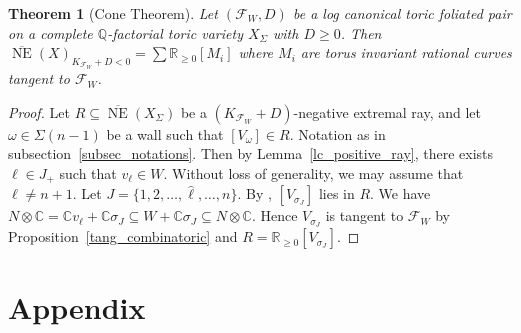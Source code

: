 \documentclass[12pt,reqno]{amsart}
\newtheorem{theorem}{Theorem}[section]
\theoremstyle{definition}
\newcommand{\mc}{\mathcal}
\newcommand{\mb}{\mathbb}
\newcommand{\on}{\operatorname}
\newcommand\cF{{\mathcal{F}}}
\newcommand\bC{{\mathbb C}}
\newcommand\bQ{{\mathbb Q}}
\newcommand\bR{{\mathbb R}}
\begin{document}
\begin{theorem}[Cone Theorem]\label{conethm}
    Let $(\cF_W,D)$ be a log canonical toric foliated pair on a complete $\bQ$-factorial toric variety $X_\Sigma$ with $D\geq 0$. 
    Then 
    $\overline{\on{NE}}(X)_{K_{\cF_W}+D<0} = \sum\bR_{\geq 0}[M_i]$ 
    where $M_i$ are torus invariant rational curves tangent to $\cF_W$. 
\end{theorem}
\begin{proof}
    Let $R\subseteq\overline{\on{NE}}(X_\Sigma)$ be a $(K_{\cF_W}+D)$-negative extremal ray, and let $\omega\in\Sigma(n-1)$ be a wall such that $[V_\omega]\in R$. Notation as in subsection~\ref{subsec_notations}.
    Then by Lemma~\ref{lc_positive_ray}, there exists $\ell\in J_+$ such that $v_\ell\in W$.
    Without loss of generality, we may assume that $\ell\neq n+1$. Let $J=\{1,2,\ldots,\widehat{\ell},\ldots,n\}$. 
    By \cite[Proposition 14-1-5(i)]{matsuki2002mmp}, $[V_{\sigma_J}]$ lies in $R$. 
    We have $N\otimes\bC=\mb C v_\ell+\mb C\sigma_J\subseteq W+\mb C \sigma_J\subseteq N\otimes\bC$. Hence  
    $V_{\sigma_{J}}$ is tangent to $\mc F_W$ by Proposition~\ref{tang_combinatoric} and $R=\mb R_{\geq 0}[V_{\sigma_J}]$. 
\end{proof}


\appendix
\section{Appendix}\label{sec:Appendix}
\end{document}
